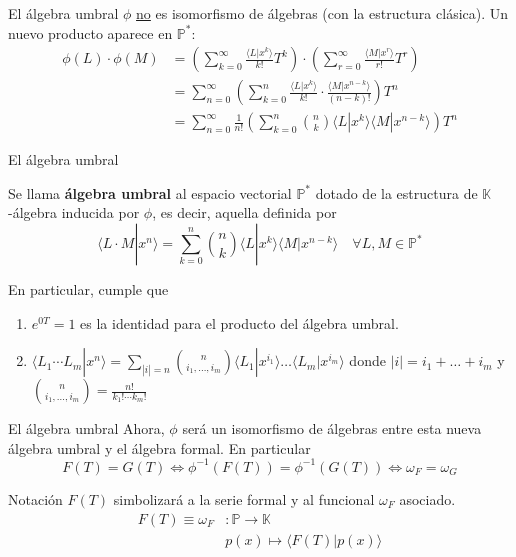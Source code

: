 \documentclass{beamer}
\newenvironment{definicion}[1][]{
  \begin{tcolorbox}[colback=red!10, colframe=red!80!black, title=Definición\ #1, fonttitle=\bfseries]
}{
  \end{tcolorbox}
}
\newcommand{\poly}{\mathbb{P}} %
\newcommand{\field}{\mathbb{K}} %
\begin{document}
  \begin{frame}{El álgebra umbral}
    $\phi$ \underline{no} es isomorfismo de álgebras (con la estructura clásica). Un nuevo producto aparece en $\poly^*$:
    \begin{align*}
      \phi(L) \cdot \phi(M) & = \left(\sum_{k=0}^\infty \frac{\langle L | x^k \rangle}{k!}T^k\right) \cdot \left(\sum_{r=0}^\infty \frac{\langle M | x^r \rangle}{r!}T^r\right) \\
      & = \sum_{n = 0}^\infty \left( \sum_{k=0}^{n} \frac{\langle L | x^k\rangle}{k!} \cdot \frac{\langle M | x^{n-k} \rangle}{(n-k)!}\right) T^n\\
      & = \sum_{n = 0}^\infty \frac{1}{n!} \left( \sum_{k=0}^{n} \binom{n}{k} \langle L | x^k\rangle \langle M | x^{n-k} \rangle\right) T^n
    \end{align*}
  \end{frame}

  \begin{frame}{El álgebra umbral}
    \begin{definicion}
      Se llama \textbf{álgebra umbral} al espacio vectorial $\poly^*$ dotado de la estructura de $\field$-álgebra inducida por $\phi$, es decir, aquella definida por
        \begin{equation*}
        \langle L \cdot M | x^n \rangle = \sum_{k=0}^n \binom{n}{k}\langle L | x^k \rangle \langle M | x^{n-k} \rangle \quad \forall L, M \in \poly^*
        \end{equation*} 
    \end{definicion}
    En particular, cumple que
    \begin{enumerate}
      \item $e^{0T} = 1$ es la identidad para el producto del álgebra umbral.
      \item $\displaystyle \langle L_1 \cdots L_m | x^n \rangle = \sum_{|i|=n}\binom{n}{i_1, \dots , i_m} \langle L_1| x^{i_1} \rangle \dots  \langle L_m | x^{i_m} \rangle$ donde $|i| = i_1 + \dots +i_m$ y $\binom{n}{i_1, \dots , i_m} = \frac{n!}{k_1! \cdots k_m!}$
    \end{enumerate}
  \end{frame}

  \begin{frame}{El álgebra umbral}
    Ahora, $\phi$ será un isomorfismo de álgebras entre esta nueva álgebra umbral y el álgebra formal. En particular
    \begin{equation*}
      F(T) = G(T) \iff \phi^{-1}(F(T)) = \phi^{-1}(G(T)) \iff \omega_F = \omega_G
    \end{equation*}

    \begin{block}{Notación}
      $F(T)$ simbolizará a la serie formal y al funcional $\omega_F$ asociado.
      \begin{align*}
        F(T) \equiv \omega_F & \colon \poly \longrightarrow \field \\
        & p(x) \mapsto \langle F(T)| p(x)\rangle
      \end{align*}
    \end{block}
  \end{frame}
\end{document}
